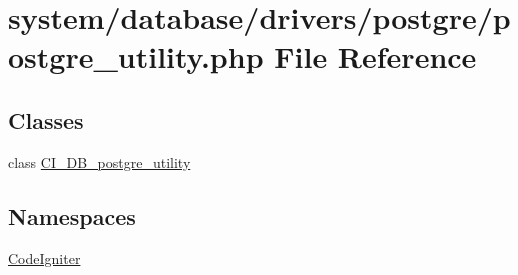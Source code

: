 \hypertarget{postgre__utility_8php}{}\section{system/database/drivers/postgre/postgre\+\_\+utility.php File Reference}
\label{postgre__utility_8php}
\subsection*{Classes}
\begin{DoxyCompactItemize}
\item 
class \mbox{\hyperlink{class_c_i___d_b__postgre__utility}{C\+I\+\_\+\+D\+B\+\_\+postgre\+\_\+utility}}
\end{DoxyCompactItemize}
\subsection*{Namespaces}
\begin{DoxyCompactItemize}
\item 
 \mbox{\hyperlink{namespace_code_igniter}{Code\+Igniter}}
\end{DoxyCompactItemize}
